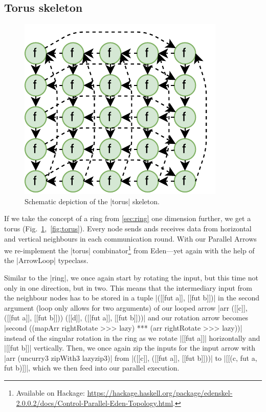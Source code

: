 \subsection{Torus skeleton}
\begin{figure}
	\includegraphics[scale=0.75]{images/torus}
	\caption{Schematic depiction of the |torus| skeleton.}
	\label{fig:ringTorusImg}
\end{figure}
If we take the concept of a ring from \ref{sec:ring} one dimension further, we get a torus (Fig.~\ref{fig:ringTorusImg},~\ref{fig:torus}). Every node sends ands receives data from horizontal and vertical neighbours in each communication round.
With our Parallel Arrows we re-implement the |torus| combinator\footnote{Available on Hackage: \url{https://hackage.haskell.org/package/edenskel-2.0.0.2/docs/Control-Parallel-Eden-Topology.html}.} from Eden---yet again with the help of the |ArrowLoop| typeclass.

Similar to the |ring|, we once again start by rotating the input, but this time not only in one direction, but in two. This means that the intermediary input from the neighbour nodes has to be stored in a tuple |([[fut a]], [[fut b]])| in the second argument (loop only allows for two arguments) of our looped arrow |arr ([[c]], ([[fut a]], [[fut b]])) ([[d]], ([[fut a]], [[fut b]]))| and our rotation arrow becomes |second ((mapArr rightRotate >>> lazy) *** (arr rightRotate >>> lazy))| instead of the singular rotation in the ring as we rotate |[[fut a]]| horizontally and |[[fut b]]| vertically. Then, we once again zip the inputs for the input arrow with |arr (uncurry3 zipWith3 lazyzip3)| from |([[c]], ([[fut a]], [[fut b]]))| to |[[(c, fut a, fut b)]]|, which we then feed into our parallel execution.

